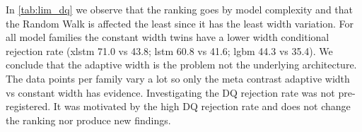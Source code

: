 %
In \cref{tab:lim_dq} we observe that the ranking goes by model complexity and that the Random Walk is affected the least since it has the least width variation. For all model families the constant width twins have a lower width conditional rejection rate (xlstm 71.0 vs 43.8; lstm 60.8 vs 41.6; lgbm 44.3 vs 35.4). We conclude that the adaptive width is the problem not the underlying architecture. The data points per family vary a lot so only the meta contrast adaptive width vs constant width has evidence. 
%
Investigating the DQ rejection rate was not pre-registered. It was motivated by the high DQ rejection rate and does not change the ranking nor produce new findings. 

